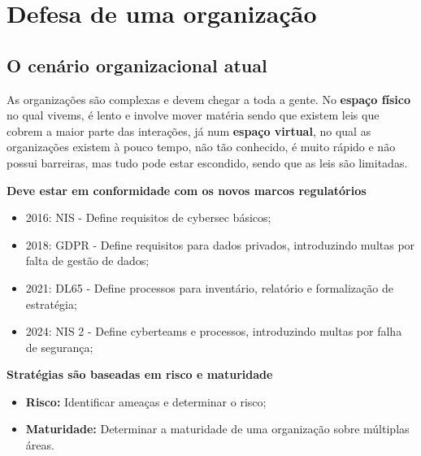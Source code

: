 \documentclass{article}
\begin{document}
\pagebreak

\section{Defesa de uma organização}

\subsection{O cenário organizacional atual}

\begin{flushleft}
  As organizações são complexas e devem chegar a toda a gente. No \textbf{espaço físico}
  no qual vivems, é lento e involve mover matéria sendo que existem leis que cobrem
  a maior parte das interações, já num \textbf{espaço virtual}, no qual as
  organizações existem à pouco tempo, não tão conhecido, é muito rápido e não possui
  barreiras, mas tudo pode estar escondido, sendo que as leis são limitadas.

  \vspace{2mm}

  \textbf{Deve estar em conformidade com os novos marcos regulatórios}
  \begin{itemize}
    \item 2016: NIS - Define requisitos de cybersec básicos;
    \item 2018: GDPR - Define requisitos para dados privados, introduzindo
    multas por falta de gestão de dados;
    \item 2021: DL65 - Define processos para inventário, relatório e
    formalização de estratégia;
    \item 2024: NIS 2 - Define cyberteams e processos, introduzindo
    multas por falha de segurança;
  \end{itemize}

  \vspace{2mm}

  \textbf{Stratégias são baseadas em risco e maturidade}
  \begin{itemize}
    \item \textbf{Risco:} Identificar ameaças e determinar o risco;
    \item \textbf{Maturidade:} Determinar a maturidade de uma organização sobre
    múltiplas áreas.
  \end{itemize}
\end{flushleft}
\end{document}
